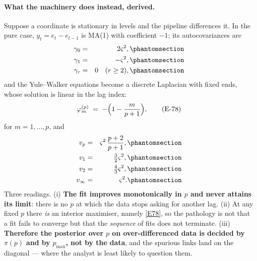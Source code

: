 \paragraph{What the machinery does instead, derived.} Suppose a coordinate is
stationary in levels and the pipeline differences it. In the pure case,
$y_t=e_t-e_{t-1}$ is MA(1) with coefficient $-1$; its autocovariances are
\begin{eqnarray}
\gamma_0 &=& 2\varsigma^2,
  \Elabel{E-77A}{E77_A} \\
\gamma_1 &=& -\varsigma^2,
  \Elabel{E-77B}{E77_B} \\
\gamma_r &=& 0 \quad (r\ge2),
  \Elabel{E-77C}{E77_C}
\end{eqnarray}
and the Yule--Walker equations become a discrete Laplacian with fixed ends, whose
solution is linear in the lag index:
\begin{equation}
\varphi_m^{(p)} \;=\; -\Bigl(1-\frac{m}{p+1}\Bigr),
\tag{E-78}\label{E78}
\end{equation}
for $m=1,\dots,p$, and
\begin{eqnarray}
v_p &=& \varsigma^2\,\frac{p+2}{p+1},
  \Elabel{E-79A}{E79_A} \\
v_1 &=& \tfrac32\varsigma^2,
  \Elabel{E-79B}{E79_B} \\
v_2 &=& \tfrac43\varsigma^2,
  \Elabel{E-79C}{E79_C} \\
v_\infty &=& \varsigma^2.
  \Elabel{E-79D}{E79_D}
\end{eqnarray}
Three readings. (i) \textbf{The fit improves monotonically in $p$ and never attains
its limit}: there is no $p$ at which the data stops asking for another lag. (ii) At
any fixed $p$ there \emph{is} an interior maximiser, namely \eqref{E78}, so the
pathology is not that a fit fails to converge but that the \emph{sequence} of fits
does not terminate. (iii) \textbf{Therefore the posterior over $p$ on
over-differenced data is decided by $\pi(p)$ and by $p_{\max}$, not by the data}, and
the spurious links land on the diagonal --- where the analyst is least likely to
question them.

